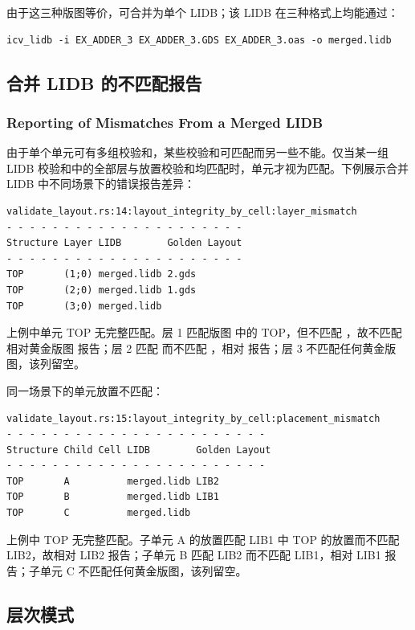 由于这三种版图等价，可合并为单个 LIDB；该 LIDB 在三种格式上均能通过：

\begin{lstlisting}
icv_lidb -i EX_ADDER_3 EX_ADDER_3.GDS EX_ADDER_3.oas -o merged.lidb
\end{lstlisting}

\subsection{合并 LIDB 的不匹配报告}
\subsubsection*{Reporting of Mismatches From a Merged LIDB}

由于单个单元可有多组校验和，某些校验和可匹配而另一些不能。仅当某一组 LIDB 校验和中的全部层与放置校验和均匹配时，单元才视为匹配。下例展示合并 LIDB 中不同场景下的错误报告差异：

\begin{lstlisting}
validate_layout.rs:14:layout_integrity_by_cell:layer_mismatch
- - - - - - - - - - - - - - - - - - - - -
Structure Layer LIDB        Golden Layout
- - - - - - - - - - - - - - - - - - - - -
TOP       (1;0) merged.lidb 2.gds
TOP       (2;0) merged.lidb 1.gds
TOP       (3;0) merged.lidb
\end{lstlisting}

上例中单元 TOP 无完整匹配。层 1 匹配版图  中的 TOP，但不匹配 ，故不匹配相对黄金版图  报告；层 2 匹配  而不匹配 ，相对  报告；层 3 不匹配任何黄金版图，该列留空。

同一场景下的单元放置不匹配：

\begin{lstlisting}
validate_layout.rs:15:layout_integrity_by_cell:placement_mismatch
- - - - - - - - - - - - - - - - - - - - - - -
Structure Child Cell LIDB        Golden Layout
- - - - - - - - - - - - - - - - - - - - - - -
TOP       A          merged.lidb LIB2
TOP       B          merged.lidb LIB1
TOP       C          merged.lidb
\end{lstlisting}

上例中 TOP 无完整匹配。子单元 A 的放置匹配 LIB1 中 TOP 的放置而不匹配 LIB2，故相对 LIB2 报告；子单元 B 匹配 LIB2 而不匹配 LIB1，相对 LIB1 报告；子单元 C 不匹配任何黄金版图，该列留空。

\subsection{层次模式}
